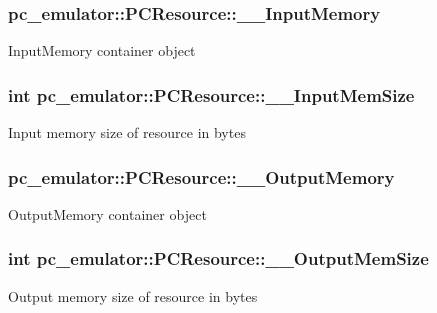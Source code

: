 \subsubsection[{\texorpdfstring{\+\_\+\+\_\+\+Input\+Memory}{__InputMemory}}]{ pc\+\_\+emulator\+::\+P\+C\+Resource\+::\+\_\+\+\_\+\+Input\+Memory}\hypertarget{classpc__emulator_1_1PCResource_a8581fead293ac0f5218bbc4de5241999}{}\label{classpc__emulator_1_1PCResource_a8581fead293ac0f5218bbc4de5241999}
Input\+Memory container object 
\subsubsection[{\texorpdfstring{\+\_\+\+\_\+\+Input\+Mem\+Size}{__InputMemSize}}]{\setlength{\rightskip}{0pt plus 5cm}int pc\+\_\+emulator\+::\+P\+C\+Resource\+::\+\_\+\+\_\+\+Input\+Mem\+Size}\hypertarget{classpc__emulator_1_1PCResource_afb2356d0dcf4db0b6a04302861a26f18}{}\label{classpc__emulator_1_1PCResource_afb2356d0dcf4db0b6a04302861a26f18}
Input memory size of resource in bytes 
\subsubsection[{\texorpdfstring{\+\_\+\+\_\+\+Output\+Memory}{__OutputMemory}}]{ pc\+\_\+emulator\+::\+P\+C\+Resource\+::\+\_\+\+\_\+\+Output\+Memory}\hypertarget{classpc__emulator_1_1PCResource_aa70b08417c498d378158b048915ff8c0}{}\label{classpc__emulator_1_1PCResource_aa70b08417c498d378158b048915ff8c0}
Output\+Memory container object 
\subsubsection[{\texorpdfstring{\+\_\+\+\_\+\+Output\+Mem\+Size}{__OutputMemSize}}]{\setlength{\rightskip}{0pt plus 5cm}int pc\+\_\+emulator\+::\+P\+C\+Resource\+::\+\_\+\+\_\+\+Output\+Mem\+Size}\hypertarget{classpc__emulator_1_1PCResource_a9b24906c7b1fcaee0ce72018c75bae9f}{}\label{classpc__emulator_1_1PCResource_a9b24906c7b1fcaee0ce72018c75bae9f}
Output memory size of resource in bytes 
